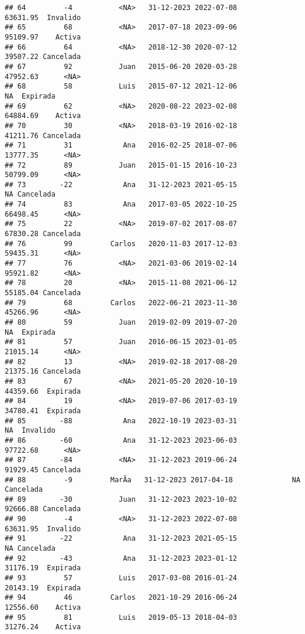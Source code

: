 \documentclass[
]{article}
\begin{document}
\begin{verbatim}
## 64         -4           <NA>   31-12-2023 2022-07-08        63631.95  Invalido
## 65         68           <NA>   2017-07-18 2023-09-06        95109.97    Activa
## 66         64           <NA>   2018-12-30 2020-07-12        39507.22 Cancelada
## 67         92           Juan   2015-06-20 2020-03-28        47952.63      <NA>
## 68         58           Luis   2015-07-12 2021-12-06              NA  Expirada
## 69         62           <NA>   2020-08-22 2023-02-08        64884.69    Activa
## 70         30           <NA>   2018-03-19 2016-02-18        41211.76 Cancelada
## 71         31            Ana   2016-02-25 2018-07-06        13777.35      <NA>
## 72         89           Juan   2015-01-15 2016-10-23        50799.09      <NA>
## 73        -22            Ana   31-12-2023 2021-05-15              NA Cancelada
## 74         83            Ana   2017-03-05 2022-10-25        66498.45      <NA>
## 75         22           <NA>   2019-07-02 2017-08-07        67830.28 Cancelada
## 76         99         Carlos   2020-11-03 2017-12-03        59435.31      <NA>
## 77         76           <NA>   2021-03-06 2019-02-14        95921.82      <NA>
## 78         20           <NA>   2015-11-08 2021-06-12        55185.04 Cancelada
## 79         68         Carlos   2022-06-21 2023-11-30        45266.96      <NA>
## 80         59           Juan   2019-02-09 2019-07-20              NA  Expirada
## 81         57           Juan   2016-06-15 2023-01-05        21015.14      <NA>
## 82         13           <NA>   2019-02-18 2017-08-20        21375.16 Cancelada
## 83         67           <NA>   2021-05-20 2020-10-19        44359.66  Expirada
## 84         19           <NA>   2019-07-06 2017-03-19        34780.41  Expirada
## 85        -88            Ana   2022-10-19 2023-03-31              NA  Invalido
## 86        -60            Ana   31-12-2023 2023-06-03        97722.68      <NA>
## 87        -84           <NA>   31-12-2023 2019-06-24        91929.45 Cancelada
## 88         -9         MarÃ­a   31-12-2023 2017-04-18              NA Cancelada
## 89        -30           Juan   31-12-2023 2023-10-02        92666.88 Cancelada
## 90         -4           <NA>   31-12-2023 2022-07-08        63631.95  Invalido
## 91        -22            Ana   31-12-2023 2021-05-15              NA Cancelada
## 92        -43            Ana   31-12-2023 2023-01-12        31176.19  Expirada
## 93         57           Luis   2017-03-08 2016-01-24        20143.19  Expirada
## 94         46         Carlos   2021-10-29 2016-06-24        12556.60    Activa
## 95         81           Luis   2019-05-13 2018-04-03        31276.24    Activa

\end{verbatim}
\end{document}
